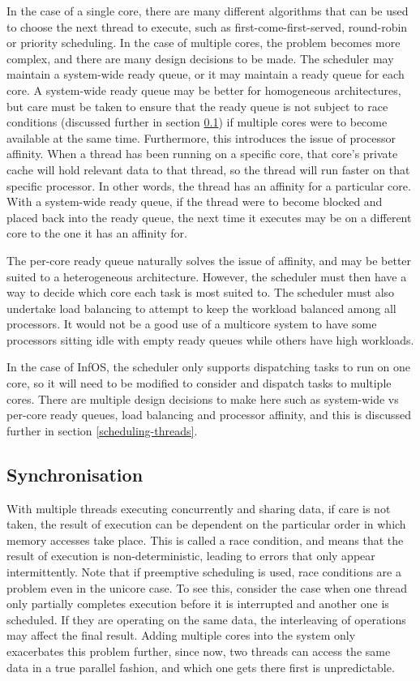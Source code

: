 \documentclass[bsc,frontabs,twoside,singlespacing,parskip,deptreport]{infthesis}     %
\begin{document}
In the case of a single core, there are many different algorithms that can be used to choose the next thread to execute, such as first-come-first-served, round-robin or priority scheduling. In the case of multiple cores, the problem becomes more complex, and there are many design decisions to be made. The scheduler may maintain a system-wide ready queue, or it may maintain a ready queue for each core. A system-wide ready queue may be better for homogeneous architectures, but care must be taken to ensure that the ready queue is not subject to race conditions (discussed further in section \ref{synchronisation-challenges}) if multiple cores were to become available at the same time. Furthermore, this introduces the issue of processor affinity. When a thread has been running on a specific core, that core’s private cache will hold relevant data to that thread, so the thread will run faster on that specific processor. In other words, the thread has an affinity for a particular core. With a system-wide ready queue, if the thread were to become blocked and placed back into the ready queue, the next time it executes may be on a different core to the one it has an affinity for.

The per-core ready queue naturally solves the issue of affinity, and may be better suited to a heterogeneous architecture. However, the scheduler must then have a way to decide which core each task is most suited to. The scheduler must also undertake load balancing to attempt to keep the workload balanced among all processors. It would not be a good use of a multicore system to have some processors sitting idle with empty ready queues while others have high workloads. 

In the case of InfOS, the scheduler only supports dispatching tasks to run on one core, so it will need to be modified to consider and dispatch tasks to multiple cores. There are multiple design decisions to make here such as system-wide vs per-core ready queues, load balancing and processor affinity, and this is discussed further in section \ref{scheduling-threads}.

\subsection{Synchronisation} \label{synchronisation-challenges}
With multiple threads executing concurrently and sharing data, if care is not taken, the result of execution can be dependent on the particular order in which memory accesses take place. This is called a race condition, and means that the result of execution is non-deterministic, leading to errors that only appear intermittently. Note that if preemptive scheduling is used, race conditions are a problem even in the unicore case. To see this, consider the case when one thread only partially completes execution before it is interrupted and another one is scheduled. If they are operating on the same data, the interleaving of operations may affect the final result. Adding multiple cores into the system only exacerbates this problem further, since now, two threads can access the same data in a true parallel fashion, and which one gets there first is unpredictable. 
\end{document}
